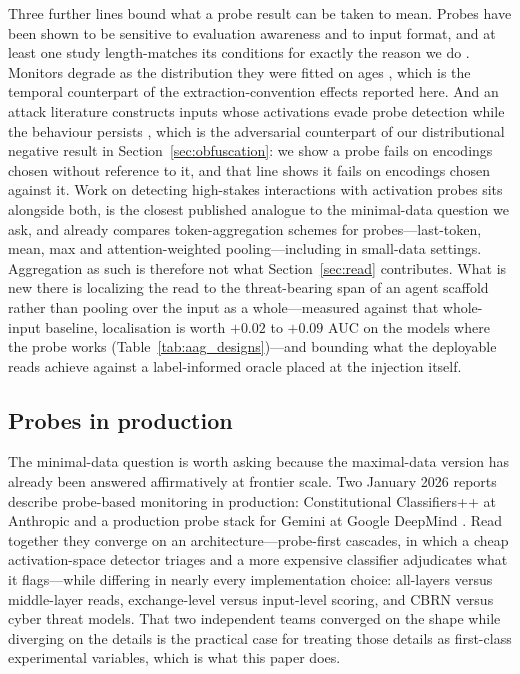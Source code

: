 Three further lines bound what a probe result can be taken to mean. Probes have been shown to be sensitive to
evaluation awareness and to input format, and at least one study length-matches its conditions for exactly the reason
we do \cite{evalawareness2026}. Monitors degrade as the distribution they were fitted on ages
\cite{staleness2026}, which is the temporal counterpart of the extraction-convention effects reported here. And an
attack literature constructs inputs whose activations evade probe detection while the behaviour persists
\cite{bailey2025obfuscated}, which is the
adversarial counterpart of our distributional negative result in Section~\ref{sec:obfuscation}: we show a probe fails
on encodings chosen without reference to it, and that line shows it fails on encodings chosen against it. Work on detecting
high-stakes interactions with activation probes \cite{mckenzie2025probes} sits alongside both, is the closest
published analogue to the minimal-data question we ask, and already compares token-aggregation schemes for
probes---last-token, mean, max and attention-weighted pooling---including in small-data settings. Aggregation as such
is therefore not what Section~\ref{sec:read} contributes. What is new there is localizing the read to the
threat-bearing span of an agent scaffold rather than pooling over the input as a whole---measured against that
whole-input baseline, localisation is worth $+0.02$ to $+0.09$ AUC on the models where the probe works
(Table~\ref{tab:aag_designs})---and bounding what the deployable reads achieve against a label-informed oracle placed
at the injection itself.

\subsection{Probes in production}
\label{sec:production}

The minimal-data question is worth asking because the maximal-data version has already been answered affirmatively at
frontier scale. Two January 2026 reports describe probe-based monitoring in production: Constitutional
Classifiers++ at Anthropic \cite{cunningham2026classifiers} and a production probe stack for Gemini at Google
DeepMind \cite{gdm2026probes}. Read together they converge on an architecture---probe-first cascades, in which a cheap
activation-space detector triages and a more expensive classifier adjudicates what it flags---while differing in
nearly every implementation choice: all-layers versus middle-layer reads, exchange-level versus input-level scoring,
and CBRN versus cyber threat models. That two independent teams converged on the shape while diverging on the details
is the practical case for treating those details as first-class experimental variables, which is what this paper does.


